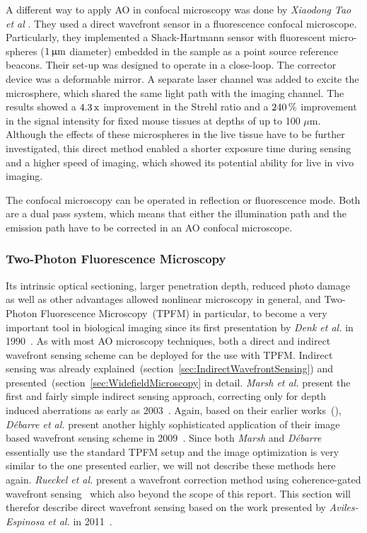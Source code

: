 A different way to apply AO in confocal microscopy was done by \textit{Xiaodong Tao et al} \cite{scan_Confocal_direct_sensing}. They used a direct wavefront sensor in a fluorescence confocal microscope. Particularly, they implemented a Shack-Hartmann sensor with fluorescent micro-spheres ($\unit[1]{\upmu m}$ diameter) embedded in the sample as a point source reference beacons. Their set-up was designed to operate in a close-loop. The corrector device was a deformable mirror. A separate laser channel was added to excite the microsphere, which shared the same light path with the imaging channel. The results showed a $\unit[4.3]{\text{x}}$ improvement in the Strehl ratio and a $\unit[240]{\%}$ improvement in the signal intensity for fixed mouse tissues at depths of up to 100 $\mu$m. Although the effects of these microspheres in the live tissue have to be further investigated, this direct method enabled a shorter exposure time during sensing and a higher speed of imaging, which showed its potential ability for live in vivo imaging.

The confocal microscopy can be operated in reflection or fluorescence mode. Both are a dual pass system, which means that either the illumination path and the emission path have to be corrected in an AO confocal microscope. 

\subsubsection{Two-Photon Fluorescence Microscopy}
\label{sec:twoPhotonExcitation}

Its intrinsic optical sectioning, larger penetration depth, reduced photo damage as well as other advantages allowed nonlinear microscopy in general, and Two-Photon Fluorescence Microscopy~(TPFM) in particular, to become a very important tool in biological imaging since its first presentation by \emph{Denk et al.} in 1990~\cite{scan_TPFM_principle}. As with most AO microscopy techniques, both a direct and indirect wavefront sensing scheme can be deployed for the use with TPFM. Indirect sensing was already explained~(section~\ref{sec:IndirectWavefrontSensing}) and presented~(section~\ref{sec:WidefieldMicroscopy} in detail. \emph{Marsh et al.} present the first and fairly simple indirect sensing approach, correcting only for depth induced aberrations as early as 2003~\cite{scan_TPFM_pratical}. Again, based on their earlier works~(\cite{wide_AOM_loew_freq,wide_AOM_structured_illu}), \emph{D\'{e}barre et al.} present another highly sophisticated application of their image based wavefront sensing scheme in 2009~\cite{scan_TPFM_image_based}. Since both \emph{Marsh} and \emph{D\'{e}barre} essentially use the standard TPFM setup and the image optimization is very similar to the one presented earlier, we will not describe these methods here again. \emph{Rueckel et al.} present a wavefront correction method using coherence-gated wavefront sensing~\cite{scan_TPFM_gated_wavefront} which also beyond the scope of this report. This section will therefor describe direct wavefront sensing based on the work presented by \emph{Aviles-Espinosa et al.} in 2011~\cite{scan_TPFM_guide_start}.\newline

